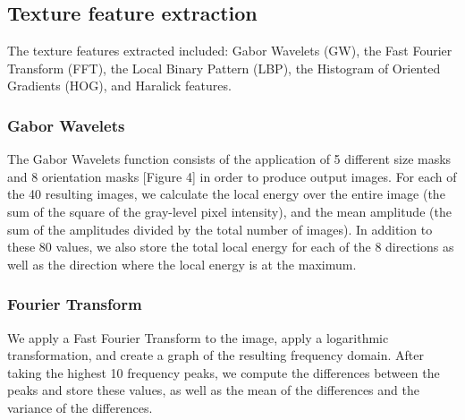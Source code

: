 \subsection{Texture feature extraction}


The texture features extracted included: Gabor Wavelets\cite{Zheng_2004} (GW), the Fast Fourier Transform (FFT), the Local Binary Pattern (LBP), the Histogram of Oriented Gradients (HOG), and Haralick features.

\subsubsection{Gabor Wavelets}

The Gabor Wavelets function consists of the application of 5 different size masks and 8 orientation masks [Figure 4] in order to produce output images. For each of the 40 resulting images, we calculate the local energy over the entire image (the sum of the square of the gray-level pixel intensity), and the mean amplitude (the sum of the amplitudes divided by the total number of images). In addition to these 80 values, we also store the total local energy for each of the 8 directions as well as the direction where the local energy is at the maximum.

\subsubsection{Fourier Transform}

We apply a Fast Fourier Transform to the image, apply a logarithmic transformation, and create a graph of the resulting frequency domain. After taking the highest 10 frequency peaks, we compute the differences between the peaks and store these values, as well as the mean of the differences and the variance of the differences. 

    
    
    
    
    
  
  
  
  
  
  
  
